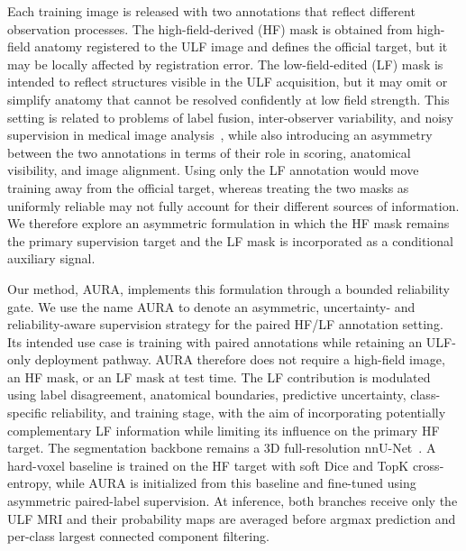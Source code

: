 \documentclass[runningheads]{llncs}
\begin{document}
Each training image is released with two annotations that reflect different observation processes. The high-field-derived (HF) mask is obtained from high-field anatomy registered to the ULF image and defines the official target, but it may be locally affected by registration error. The low-field-edited (LF) mask is intended to reflect structures visible in the ULF acquisition, but it may omit or simplify anatomy that cannot be resolved confidently at low field strength. This setting is related to problems of label fusion, inter-observer variability, and noisy supervision in medical image analysis~\cite{warfield2004staple,karimi2020noisy}, while also introducing an asymmetry between the two annotations in terms of their role in scoring, anatomical visibility, and image alignment. Using only the LF annotation would move training away from the official target, whereas treating the two masks as uniformly reliable may not fully account for their different sources of information. We therefore explore an asymmetric formulation in which the HF mask remains the primary supervision target and the LF mask is incorporated as a conditional auxiliary signal.

Our method, AURA, implements this formulation through a bounded reliability gate. We use the name AURA to denote an asymmetric, uncertainty- and reliability-aware supervision strategy for the paired HF/LF annotation setting. Its intended use case is training with paired annotations while retaining an ULF-only deployment pathway. AURA therefore does not require a high-field image, an HF mask, or an LF mask at test time. The LF contribution is modulated using label disagreement, anatomical boundaries, predictive uncertainty, class-specific reliability, and training stage, with the aim of incorporating potentially complementary LF information while limiting its influence on the primary HF target. The segmentation backbone remains a 3D full-resolution nnU-Net~\cite{isensee2021nnunet}. A hard-voxel baseline is trained on the HF target with soft Dice and TopK cross-entropy, while AURA is initialized from this baseline and fine-tuned using asymmetric paired-label supervision. At inference, both branches receive only the ULF MRI and their probability maps are averaged before argmax prediction and per-class largest connected component filtering.
\end{document}
